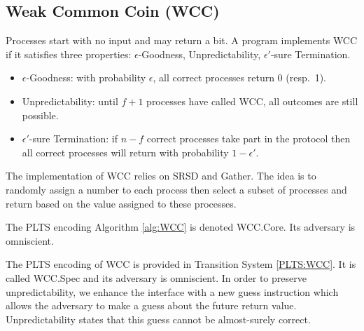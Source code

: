 \subsection{Weak Common Coin (\textsf{WCC})}

Processes start with no input and may return a bit.
A program implements \textsf{WCC} if it satisfies three properties: $\epsilon$-Goodness,
Unpredictability, $\epsilon'$-sure Termination.
\begin{itemize}
    \item $\epsilon$-Goodness: with probability $\epsilon$, all correct processes return 0
    (resp.\ 1).
    \item Unpredictability: until $f+1$ processes have called \textsf{WCC}, all outcomes are still
    possible.
    \item $\epsilon'$-sure Termination: if $n-f$ correct processes take part in the protocol then all correct
    processes will return with probability $1-\epsilon'$.
\end{itemize}

\begin{implementation}
    \label{impl:WCC}

    The implementation of \textsf{WCC} relies on \textsf{SRSD} and \textsf{Gather}.
    The idea is to randomly assign a number to each process
    then select a subset of processes
    and return based on the value assigned to these processes.
\end{implementation}

\begin{definition}
    \label{WCC:Core}

    The PLTS encoding Algorithm \ref{alg:WCC} is denoted \textsf{WCC.Core}.
    Its adversary is omniscient.
\end{definition}

\begin{specification}
    \label{WCC:Spec}

    The PLTS encoding of \textsf{WCC} is provided in Transition System \ref{PLTS:WCC}.
    It is called \textsf{WCC.Spec} and its adversary is omniscient.
    In order to preserve unpredictability, we enhance
    the interface with a new guess instruction which allows the adversary to make
    a guess about the future return value. Unpredictability states that this guess
    cannot be almost-surely correct.
\end{specification}


